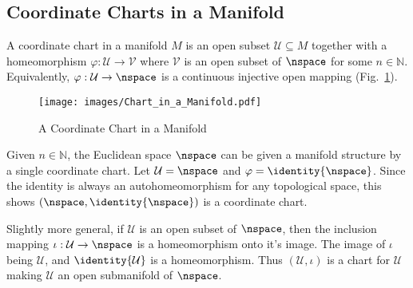 \documentclass{book}                                                           %
\begin{document}
            \subsection{Coordinate Charts in a Manifold}
                A coordinate chart in a manifold $M$ is an open subset
                $\mathcal{U}\subseteq{M}$ together with a homeomorphism
                $\varphi:\mathcal{U}\rightarrow\mathcal{V}$ where $\mathcal{V}$
                is an open subset of $\nspace$ for some $n\in\mathbb{N}$.
                Equivalently, $\varphi:\mathcal{U}\rightarrow\nspace$ is a
                continuous injective open mapping
                (Fig.~\ref{fig:Coordinate_Chart}).
                \begin{figure}[H]
                    \centering
                    \captionsetup{type=figure}
                    \texttt{[image: images/Chart\_in\_a\_Manifold.pdf]}
                    \caption{A Coordinate Chart in a Manifold}
                    \label{fig:Coordinate_Chart}
                \end{figure}
                \begin{example}
                    Given $n\in\mathbb{N}$, the Euclidean space $\nspace$ can be
                    given a manifold structure by a single coordinate chart. Let
                    $\mathcal{U}=\nspace$ and $\varphi=\identity{\nspace}$.
                    Since the identity is always an autohomeomorphism for any
                    topological space, this shows $(\nspace,\identity{\nspace})$
                    is a coordinate chart.
                \end{example}
                \begin{example}
                    Slightly more general, if $\mathcal{U}$ is an open subset of
                    $\nspace$, then the inclusion mapping
                    $\iota:\mathcal{U}\rightarrow\nspace$ is a homeomorphism
                    onto it's image. The image of $\iota$ being $\mathcal{U}$,
                    and $\identity{\mathcal{U}}$ is a homeomorphism. Thus
                    $(\mathcal{U},\iota)$ is a chart for $\mathcal{U}$ making
                    $\mathcal{U}$ an open submanifold of $\nspace$.
                \end{example}
\end{document}

